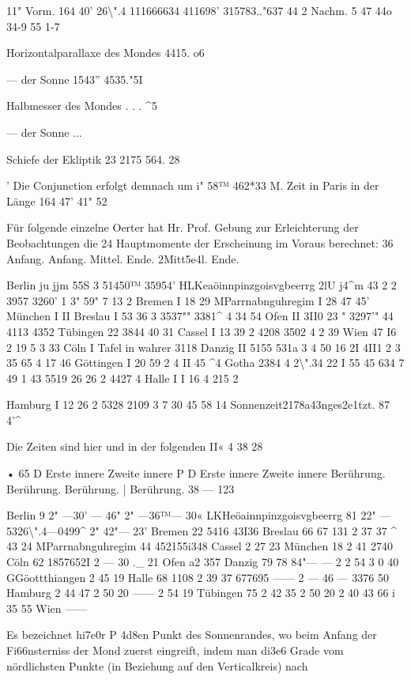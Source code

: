\documentclass[10pt,a4paper]{article}
\begin{document}
11" Vorm. 164\textdegree{} 40' 26\textbackslash{}".4 111666634\textdegree{} 411698' 315783.."637 44 2 Nachm. 5 47 44o 34-9 55 1-7

Horizontalparallaxe des Mondes 4415. o6

— der Sonne 1543'' 4535."5I

Halbmesser des Mondes . . . \textasciicircum{}5

— der Sonne ...

Schiefe der Ekliptik 23\textdegree{} 2175 564. 28

' Die Conjunction erfolgt demnach um i" 58™ 462*33 M. Zeit in Paris in der Länge 164\textdegree{} 47' 41" 52

Für folgende einzelne Oerter hat Hr. Prof. Gebung zur Erleichterung der Beobachtungen die 24 Hauptmomente der Erscheinung im Voraus berechnet: 36 Anfang. Anfang. Mittel. Ende. 2Mitt5e4l. Ende.

Berlin ju jjm 55S 3 51450™ 35954' HLKeaöinnpinzgoisvgbeerrg 2lU j4\textasciicircum{}m 43 2 2 3957 3260' 1 3" 59" 7 13 2 Bremen I 18 29 MParrnabnguhregim I 28 47 45' München I II Breslau I 53 36 3 3537"" 3381\textasciicircum{} 4 34 54 Ofen II 3II0 23 " 3297'" 44 4113 4352 Tübingen 22 3844 40 31 Cassel I 13 39 2 4208 3502 4 2 39 Wien 47 I6 2 19 5 3 33 Cöln I Tafel in wahrer 3118 Danzig II 5155 531a 3 4 50 16 2I 4II1 2 3 35 65 4 17 46 Göttingen I 20 59 2 4 II 45 \textasciicircum{}4 Gotha 2384 4 2\textbackslash{}".34 22 I 55 45 634 7 49 1 43 5519 26 26 2 4427 4 Halle I I 16 4 215 2

Hamburg I 12 26 2 5328 2109 3 7 30 45 58 14 Sonnenzeit2178a43nges2e1tzt. 87 4'\textasciicircum{}

Die Zeiten sind hier und in der folgenden II« 4 38 28

• 65 D Erste innere Zweite innere P D Erste innere Zweite innere Berührung. Berührung. Berührung. | Berührung. 38 — 123

Berlin 9 2" —30' — 46" 2" —36™— 30« LKHeöainnpinzgoisvgbeerrg 81 22" —5326\textbackslash{}".4—0499\textasciicircum{} 2" 42"— 23' Bremen 22 5416 43I36 Breslau 66 67 131 2 37 37 \textasciicircum{} 43 24 MParrnabnguhregim 44 452155i348 Cassel 2 27 23 München 18 2 41 2740 Cöln 62 1857652I\textdegree{} 2 — 30 .\_ 21 Ofen a2 357 Danzig 79 78 84"— — 2 2 54 3 0 40 GGöottthiangen 2 45 19 Halle 68 1108 2 39 37 677695 —— 2 — 46 — 3376 50 Hamburg 2 44 47 2 50 20 —— 2 54 19 Tübingen 75 2 42 35 2 50 20 2 40 43 66 i 35 55 Wien ——

Es bezeichnet hi7e0r P 4d8en Punkt des Sonnenrandes, wo beim Anfang der Fi66n\textdegree{}sterniss der Mond zuerst eingreift, indem man di3e6 Grade vom nördlichsten Punkte (in Beziehung auf den Verticalkreis) nach
\end{document}
